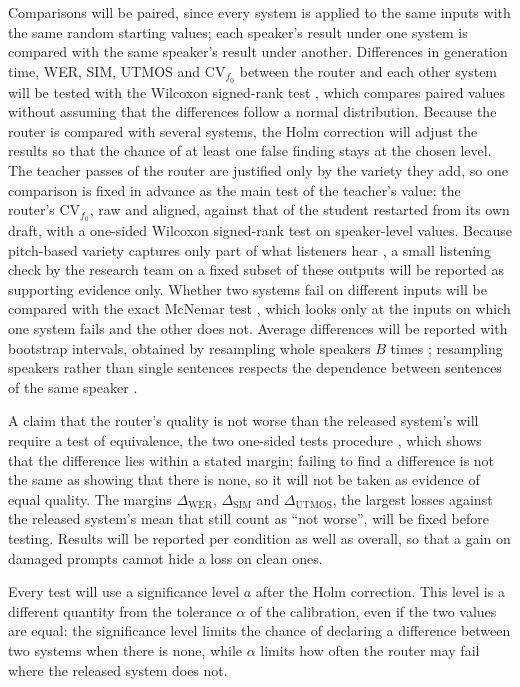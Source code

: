 Comparisons will be paired, since every system is applied to the same inputs with the same random starting values; each speaker's result under one system is compared with the same speaker's result under another. Differences in generation time, WER, SIM, UTMOS and $\mathrm{CV}_{f_0}$ between the router and each other system will be tested with the Wilcoxon signed-rank test \parencite{wilcoxon1945}, which compares paired values without assuming that the differences follow a normal distribution. Because the router is compared with several systems, the Holm correction \parencite{holm1979} will adjust the results so that the chance of at least one false finding stays at the chosen level. The teacher passes of the router are justified only by the variety they add, so one comparison is fixed in advance as the main test of the teacher's value: the router's $\mathrm{CV}_{f_0}$, raw and aligned, against that of the student restarted from its own draft, with a one-sided Wilcoxon signed-rank test on speaker-level values. Because pitch-based variety captures only part of what listeners hear \parencite{yang2025prosody}, a small listening check by the research team on a fixed subset of these outputs will be reported as supporting evidence only. Whether two systems fail on different inputs will be compared with the exact McNemar test \parencite{mcnemar1947}, which looks only at the inputs on which one system fails and the other does not. Average differences will be reported with bootstrap intervals, obtained by resampling whole speakers $B$ times \parencite{efron1979bootstrap}; resampling speakers rather than single sentences respects the dependence between sentences of the same speaker \parencite{liu2020blockwise}.

A claim that the router's quality is not worse than the released system's will require a test of equivalence, the two one-sided tests procedure \parencite{schuirmann1987}, which shows that the difference lies within a stated margin; failing to find a difference is not the same as showing that there is none, so it will not be taken as evidence of equal quality. The margins $\Delta_{\text{WER}}$, $\Delta_{\text{SIM}}$ and $\Delta_{\text{UTMOS}}$, the largest losses against the released system's mean that still count as ``not worse'', will be fixed before testing. Results will be reported per condition as well as overall, so that a gain on damaged prompts cannot hide a loss on clean ones.

Every test will use a significance level $a$ after the Holm correction. This level is a different quantity from the tolerance $\alpha$ of the calibration, even if the two values are equal: the significance level limits the chance of declaring a difference between two systems when there is none, while $\alpha$ limits how often the router may fail where the released system does not.

